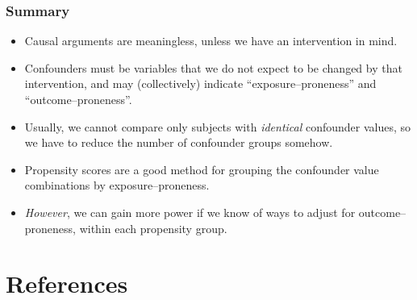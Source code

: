 \documentclass[11pt]{beamer}
\begin{document}
\begin{frame}
\frametitle{Summary}

\begin{itemize}

\item<2-> Causal arguments are meaningless, unless we have an intervention in mind.

\item<3-> Confounders must be variables that we do not expect to be changed by that intervention,
and may (collectively) indicate ``exposure--proneness'' and ``outcome--proneness''.

\item<4-> Usually, we cannot compare only subjects with \textit{identical} confounder values,
so we have to reduce the number of confounder groups somehow.

\item<5-> Propensity scores are a good method for grouping the confounder value combinations by exposure--proneness.

\item<6-> \textit{However}, we can gain more power if we  know of ways to adjust for outcome--proneness,
within each propensity group.

\end{itemize}

\end{frame}

\section{References}
\end{document}
